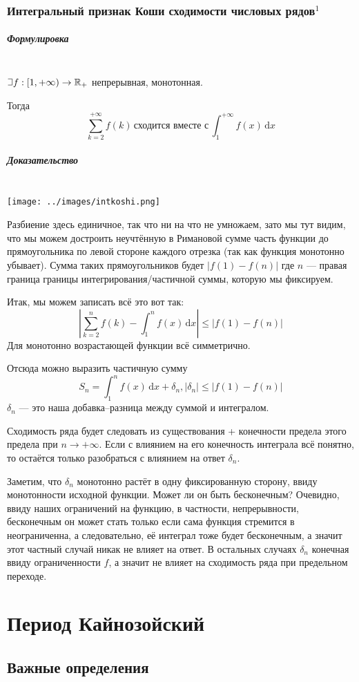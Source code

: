 \documentclass{article}
\def\letus{%
\mathord{\setbox0=\hbox{$\exists$}%
         \hbox{\kern 0.125\wd0%
               \vbox to \ht0{%
                  \hrule width 0.75\wd0%
                  \vfill%
                  \hrule width 0.75\wd0}%
               \vrule height \ht0%
               \kern 0.125\wd0}%
       }%
        }
\def\D{\,\mathrm{d}}
\let\vanillasubparagraph\subparagraph
\renewcommand{\subparagraph}[1]{\vanillasubparagraph{#1}\mbox{}\\}
\begin{document}
\subsubsection{Интегральный признак Коши сходимости числовых рядов\texorpdfstring{$^1$}{}}
\subparagraph{Формулировка}
$\letus f: [1, +\infty) \rightarrow \mathbb{R}_+$ непрерывная, монотонная.

Тогда
$$
\sum_{k=2}^{+\infty} f(k) \,\text{сходится вместе с}\, \int_1^{+\infty}f(x)\D x
$$

\subparagraph{Доказательство}
\texttt{[image: ../images/intkoshi.png]}

Разбиение здесь единичное, так что ни на что не умножаем, зато мы тут видим, что мы можем достроить неучтённую в Римановой сумме часть функции до прямоугольника по левой стороне каждого отрезка (так как функция монотонно убывает). Сумма таких прямоугольников будет $|f(1) - f(n)|$ где $n$ --- правая граница границы интегрирования/частичной суммы, которую мы фиксируем.

Итак, мы можем записать всё это вот так:
$$
\left| \sum_{k=2}^n f(k) - \int_1^n f(x) \D x \right| \le |f(1) - f(n)|
$$
Для монотонно возрастающей функции всё симметрично.

Отсюда можно выразить частичную сумму
$$
S_n = \int_1^n f(x) \D x + \delta_n, |\delta_n| \le |f(1) - f(n)|
$$
$\delta_n$ --- это наша добавка--разница между суммой и интегралом.

Сходимость ряда будет следовать из существования + конечности предела этого предела при $n\rightarrow +\infty$. Если с влиянием на его конечность интеграла всё понятно, то остаётся только разобраться с влиянием на ответ $\delta_n$.

Заметим, что $\delta_n$ монотонно растёт в одну фиксированную сторону, ввиду монотонности исходной функции. Может ли он быть бесконечным? Очевидно, ввиду наших ограничений на функцию, в частности, непрерывности, бесконечным он может стать только если сама функция стремится в неограниченна, а следовательно, её интеграл тоже будет бесконечным, а значит этот частный случай никак не влияет на ответ. В остальных случаях $\delta_n$ конечная ввиду ограниченности $f$, а значит не влияет на сходимость ряда при предельном переходе.


\section{Период Кайнозойский}
\subsection{Важные определения}
\end{document}
